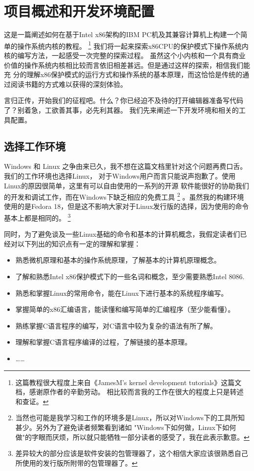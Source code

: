 
\section{项目概述和开发环境配置}

\par 这是一篇阐述如何在基于Intel x86架构的IBM PC机及其兼容计算机上构建一个简单的操作系统内核的教程。\allowbreak
\footnote{这篇教程很大程度上来自《JamesM's kernel development tutorials》这篇文档，感谢原作者的辛勤劳动。\allowbreak
相比较而言我的工作在很大的程度上只是转述和查证。}
我们将一起来探索x86CPU的保护模式下操作系统内核的编写方法，一起感受一次完整的探索过程。\allowbreak
虽然这个小内核和一个具有商业价值的操作系统内核相比较而言依旧相差甚远。但是通过这样的探索，相信我们能充\allowbreak
分的理解x86保护模式的运行方式和操作系统的基本原理，而这恰恰是传统的通过阅读书籍的方式难以获得的深刻体验。

\par 言归正传，开始我们的征程吧。什么？你已经迫不及待的打开编辑器准备写代码了？别着急，工欲善其事，必先利其器。\allowbreak
我们先来阐述一下开发环境和相关的工具配置。

\subsection{选择工作环境}
\par Windows 和 Linux 之争由来已久，我不想在这篇文档里针对这个问题再费口舌。我们的工作环境也选择Linux，\allowbreak
对于Windows用户而言只能说声抱歉了。使用Linux的原因很简单，这里有可以自由使用的一系列的开源\allowbreak
软件能很好的协助我们的开发和调试工作，而在Windows下缺乏相应的免费工具\allowbreak
\footnote {当然也可能是我学习和工作的环境多是Linux，所以对Windows下的工具所知甚少。另外为了避免读者频繁看到诸如\allowbreak
"Windows下如何做，Linux下如何做"的字眼而厌烦，所以就只能牺牲一部分读者的感受了，我在此表示歉意。}
。虽然我的构建环境使用的是Fedora 18，但是这不影响大家对于Linux发行版的选择，因为使用的命令基本上都是相同的。\allowbreak
\footnote {差异较大的部分应该是软件安装的包管理器了，这个相信大家应该很熟悉自己所使用的发行版所附带的包管理器了。}

\par 同时，为了避免谈及一些Linux基础的命令和基本的计算机概念，我假定读者们已经对以下列出的知识点有一定的理解和掌握：
\begin{itemize}
	\item 熟悉微机原理和基本的操作系统原理，了解基本的计算机原理概念。
	\item 了解和熟悉Intel x86保护模式下的一些名词和概念，至少需要熟悉Intel 8086.
	\item 熟悉和掌握Linux的常用命令，能在Linux下进行基本的系统程序编写。
	\item 掌握简单的x86汇编语言，能读懂和编写简单的汇编程序（至少能看懂）。
	\item 熟练掌握C语言程序的编写，对C语言中较为复杂的语法有所了解。
	\item 理解和掌握C语言程序编译的过程，了解链接的基本原理。
	\item ……
\end{itemize}

